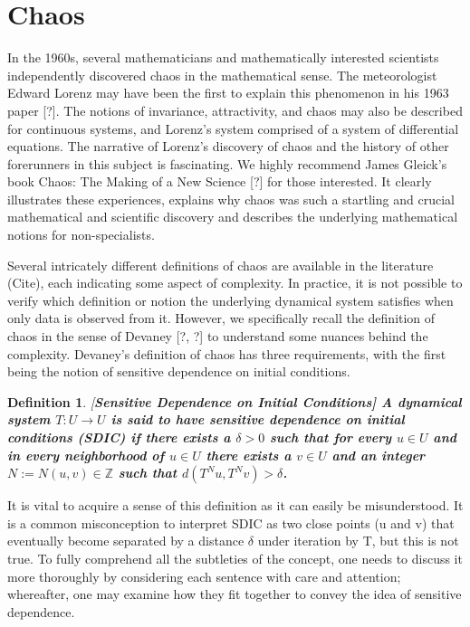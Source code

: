 \documentclass[a4paper,12pt,twoside]{report}
\newtheorem{Definition}{Definition}[]
\begin{document}

\section{Chaos}

In the 1960s, several mathematicians and mathematically interested scientists independently discovered chaos in the mathematical sense. The meteorologist Edward Lorenz may have been the first to explain this phenomenon in his 1963 paper [?]. The notions of invariance, attractivity, and chaos may also be described for continuous systems, and Lorenz's system comprised of a system of differential equations. The narrative of Lorenz's discovery of chaos and the history of other forerunners in this subject is fascinating. We highly recommend James Gleick's book Chaos: The Making of a New Science [?] for those interested. It clearly illustrates these experiences, explains why chaos was such a startling and crucial mathematical and scientific discovery and describes the underlying mathematical notions for non-specialists.

Several intricately different definitions of chaos are available in the literature (Cite), each indicating some aspect of complexity. In practice, it is not possible to verify which definition or notion the underlying dynamical system satisfies when only data is observed from it. However, we specifically recall the definition of chaos in the sense of Devaney [?, ?] to understand some nuances behind the complexity. Devaney's definition of chaos has three requirements, with the first being the notion of sensitive dependence on initial conditions.

\begin{Definition}\rm
  [\bf {Sensitive Dependence on Initial Conditions}]\label{Dfn_SDIC}\rm
A dynamical system $T: U \to U$ is said to have sensitive dependence on initial conditions (SDIC) if there exists a $\delta > 0$ such that for every $u \in U$ and in every neighborhood of $u \in U$ there exists a $v\in{U}$ and an integer $N:=N{(u,v)}\in\mathbb{Z}$ such that $d(T^Nu,T^Nv)>\delta$. 	
\end{Definition}

It is vital to acquire a sense of this definition as it can easily be misunderstood. It is a common misconception to interpret SDIC as two close points (u and v) that eventually become separated by a distance $\delta$ under iteration by T, but this is not true. To fully comprehend all the subtleties of the concept, one needs to discuss it more thoroughly by considering each sentence with care and attention; whereafter, one may examine how they fit together to convey the idea of sensitive dependence.
\end{document}
